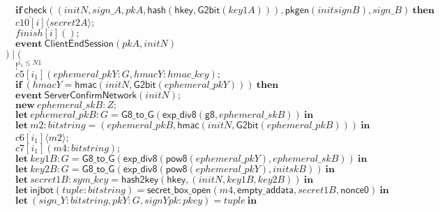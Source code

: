 \documentclass{article}
\newcommand{\cinput}[2]{{#1}({#2})}
\newcommand{\coutput}[2]{\overline{#1}\langle{#2}\rangle}
\newcommand{\kw}[1]{\mathbf{#1}}
\newcommand{\kwf}[1]{\mathsf{#1}}
\newcommand{\var}[1]{\mathit{#1}}
\newcommand{\kwt}[1]{\mathit{#1}}
\newcommand{\kwp}[1]{\mathit{#1}}
\newcommand{\kwc}[1]{\mathit{#1}}
\begin{document}
\begin{tabbing}
\>$\quad \kw{if}\ \kwf{check}(\kwf{}(\var{initN}, \var{sign{\_}A}, \var{pkA}, \kwf{hash}(\kwf{hkey}, \kwf{G2bit}(\var{key1A}))), \kwf{pkgen}(\var{initsignB}), \var{sign{\_}B})\ \kw{then}$\\
\>$\quad \coutput{\kwc{c10}[\var{i}]}{\var{secret2A}};$\\
\>$\quad \cinput{\kwc{finish}[\var{i}]}{};$\\
\>$\quad \kw{event}\ \kwf{ClientEndSession}(\var{pkA}, \var{initN})$\\
\>$) \mid ($\\
\>$\quad !^{\var{i}_{1} \leq \kwp{N1}}$\\
\>$\quad \cinput{\kwc{c5}[\var{i}_{1}]}{\var{ephemeral{\_}pkY}: \kwt{G}, \var{hmacY}: \kwt{hmac{\_}key}};$\\
\>$\quad \kw{if}\ (\var{hmacY}  =  \kwf{hmac}(\var{initN}, \kwf{G2bit}(\var{ephemeral{\_}pkY})))\ \kw{then}$\\
\>$\quad \kw{event}\ \kwf{ServerConfirmNetwork}(\var{initN});$\\
\>$\quad \kw{new}\ \var{ephemeral{\_}skB}: \kwt{Z};$\\
\>$\quad \kw{let}\ \var{ephemeral{\_}pkB}: \kwt{G} = \kwf{G8{\_}to{\_}G}(\kwf{exp{\_}div8}(\kwf{g8}, \var{ephemeral{\_}skB}))\ \kw{in}$\\
\>$\quad \kw{let}\ \var{m2}: \kwt{bitstring} = \kwf{}(\var{ephemeral{\_}pkB}, \kwf{hmac}(\var{initN}, \kwf{G2bit}(\var{ephemeral{\_}pkB})))\ \kw{in}$\\
\>$\quad \coutput{\kwc{c6}[\var{i}_{1}]}{\var{m2}};$\\
\>$\quad \cinput{\kwc{c7}[\var{i}_{1}]}{\var{m4}: \kwt{bitstring}};$\\
\>$\quad \kw{let}\ \var{key1B}: \kwt{G} = \kwf{G8{\_}to{\_}G}(\kwf{exp{\_}div8}(\kwf{pow8}(\var{ephemeral{\_}pkY}), \var{ephemeral{\_}skB}))\ \kw{in}$\\
\>$\quad \kw{let}\ \var{key2B}: \kwt{G} = \kwf{G8{\_}to{\_}G}(\kwf{exp{\_}div8}(\kwf{pow8}(\var{ephemeral{\_}pkY}), \var{initskB}))\ \kw{in}$\\
\>$\quad \kw{let}\ \var{secret1B}: \kwt{sym{\_}key} = \kwf{hash2key}(\kwf{hkey}, \kwf{}(\var{initN}, \var{key1B}, \var{key2B}))\ \kw{in}$\\
\>$\quad \kw{let}\ \kwf{injbot}(\var{tuple}: \kwt{bitstring}) = \kwf{secret{\_}box{\_}open}(\var{m4}, \kwf{empty{\_}addata}, \var{secret1B}, \kwf{nonce0})\ \kw{in}$\\
\>$\quad \kw{let}\ \kwf{}(\var{sign{\_}Y}: \kwt{bitstring}, \var{pkY}: \kwt{G}, \var{signYpk}: \kwt{pkey}) = \var{tuple}\ \kw{in}$\\

\end{tabbing}
\end{document}

